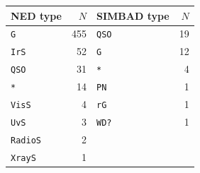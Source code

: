 \begin{ruledtabular}
\begin{tabular}{l r l r}
NED type & $N$ & SIMBAD type & $N$ \\
\hline
\texttt{G} & 455 & \texttt{QSO} & 19 \\
\texttt{IrS} & 52 & \texttt{G} & 12 \\
\texttt{QSO} & 31 & \texttt{*} & 4 \\
\texttt{*} & 14 & \texttt{PN} & 1 \\
\texttt{VisS} & 4 & \texttt{rG} & 1 \\
\texttt{UvS} & 3 & \texttt{WD?} & 1 \\
\texttt{RadioS} & 2 &  &  \\
\texttt{XrayS} & 1 &  &  \\
\end{tabular}
\end{ruledtabular}
